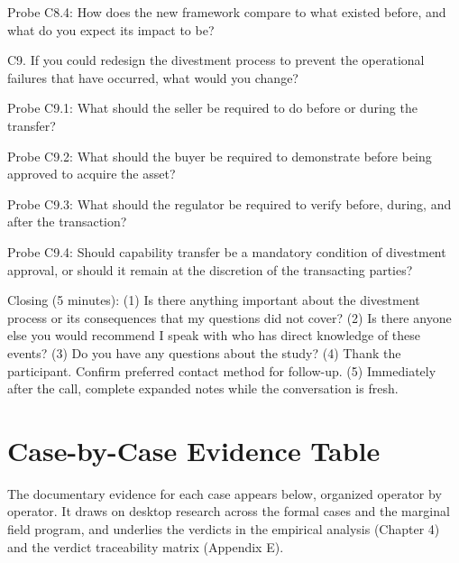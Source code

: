 \documentclass[twoside,fontset=lmodern]{mitthesis}
\begin{document}
Probe C8.4: How does the new framework compare to what existed before,
and what do you expect its impact to be?

C9. If you could redesign the divestment process to prevent the
operational failures that have occurred, what would you change?

Probe C9.1: What should the seller be required to do before or during
the transfer?

Probe C9.2: What should the buyer be required to demonstrate before
being approved to acquire the asset?

Probe C9.3: What should the regulator be required to verify before,
during, and after the transaction?

Probe C9.4: Should capability transfer be a mandatory condition of
divestment approval, or should it remain at the discretion of the
transacting parties?

Closing (5 minutes): (1) Is there anything important about the
divestment process or its consequences that my questions did not cover?
(2) Is there anyone else you would recommend I speak with who has direct
knowledge of these events? (3) Do you have any questions about the
study? (4) Thank the participant. Confirm preferred contact method for
follow-up. (5) Immediately after the call, complete expanded notes while
the conversation is fresh.


\hypertarget{case-by-case-evidence-table}{%
\chapter{Case-by-Case Evidence
Table}\label{case-by-case-evidence-table}}

The documentary evidence for each case appears below, organized operator
by operator. It draws on desktop research across the formal cases and
the marginal field program, and underlies the verdicts in the empirical
analysis (Chapter 4) and the verdict traceability matrix (Appendix E).
\end{document}
